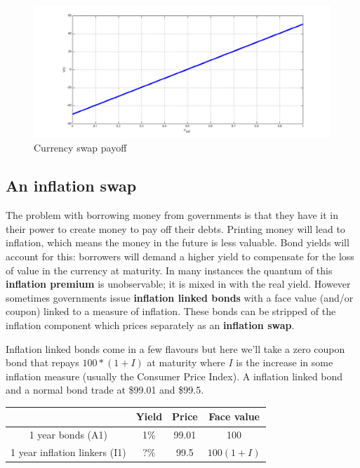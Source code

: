 \begin{figure}[ht]
\centering
  \includegraphics[width=5in] {pics/currency}
\caption{Currency swap payoff}
\label{fig:currency}
\end{figure}
 
\subsection{An inflation swap}

The problem with borrowing money from governments is that they have it in their power to create money to pay off their debts.  Printing money will lead to inflation, which means the money in the future is less valuable. Bond yields will account for this: borrowers will demand a higher yield to compensate for the loss of value in the currency at maturity. In many instances the quantum of this \textbf{inflation premium} is unobservable; it is mixed in with the real yield. However sometimes governments issue \textbf{inflation linked bonds} with a face value (and/or coupon) linked to a measure of inflation. These bonds can be stripped of the inflation component which prices separately as an \textbf{inflation swap}.

Inflation linked bonds come in a few flavours but here we'll take a zero coupon bond that repays $100*(1+I)$ at maturity where $I$ is the increase in some inflation measure (usually the Consumer Price Index).  A inflation linked bond and a normal bond trade at \$99.01 and \$99.5. 

\begin{center}
\begin{tabular}{|c|ccc|}
\hline
 & Yield & Price  & Face value \\
 \hline
1 year bonds (A1) & 1\% & 99.01 & 100 \\
1 year inflation linkers (I1) & ?\% &  99.5 & $100(1+I)$\\
\hline
\end{tabular}
\end{center}

